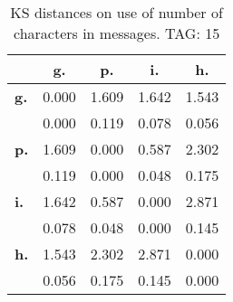 \begin{table}[h!]
\begin{center}
\begin{tabular}{| l || c | c | c | c |}\hline
 & {\bf g.} & {\bf p.} & {\bf i.} & {\bf h.} \\\hline\hline
{\bf g.} & 0.000 & 1.609 & 1.642 & 1.543 \\
{\bf } & 0.000 & 0.119 & 0.078 & 0.056 \\\hline
{\bf p.} & 1.609 & 0.000 & 0.587 & 2.302 \\
{\bf } & 0.119 & 0.000 & 0.048 & 0.175 \\\hline
{\bf i.} & 1.642 & 0.587 & 0.000 & 2.871 \\
{\bf } & 0.078 & 0.048 & 0.000 & 0.145 \\\hline
{\bf h.} & 1.543 & 2.302 & 2.871 & 0.000 \\
{\bf } & 0.056 & 0.175 & 0.145 & 0.000 \\\hline
\end{tabular}
\caption{KS distances on use of number of characters in messages. TAG: 15}
\end{center}
\end{table}